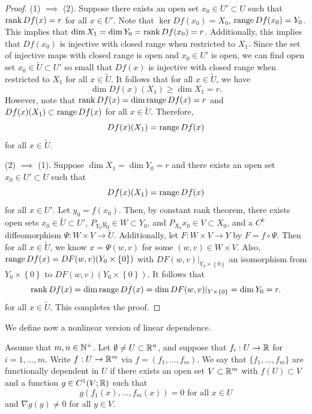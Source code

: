 \documentclass[a4paper]{article}
\begin{document}
\begin{proof}
{
\newcommand{\py}{{P_{Y_0}}}
\newcommand{\pyy}{{P_{Y_1}}}
\newcommand{\px}{{P_{X_0}}}
\newcommand{\pxx}{{P_{X_1}}}
(1) $\implies$ (2). Suppose there exists an open set 
$x_0 \in U' \subset U$ such that $\operatorname{rank} Df(x) = r$
for all $x \in U'$. Note that $\ker Df(x_0) = X_0$, 
$\operatorname{range} Df(x_0) = Y_0$. 
This implies that $\dim X_1 = \dim Y_0 = \operatorname{rank} Df(x_0) = r$.
Additionally, 
this implies that $Df(x_0)$ is injective with closed 
range when restricted to $X_1$. Since the set of 
injective maps with closed range is open and 
$x_0 \in U'$ is open, we can find open set 
$x_0 \in \tilde{U} \subset U'$
so small that $Df(x)$ is injective with closed range 
when restricted to $X_1$ for all $x \in \tilde{U}$. 
It follows that for all $x \in \tilde{U}$, we have 
\[
\dim Df(x) (X_1) \geq \dim X_1 = r.
\]
However, note that 
$\operatorname{rank} Df(x) = \dim \operatorname{range} Df(x) = r$ 
and $Df(x) (X_1) \subset \operatorname{range} Df(x)$ for all $x \in \tilde{U}$.
Therefore,
\[
Df(x) (X_1) = \operatorname{range} Df(x)
\] 
for all $x \in \tilde{U}$.

(2) $\implies$ (1).
Suppose $\dim X_1 = \dim Y_0 = r$ and there exists an open 
set $x_0 \in U' \subset U$ such that 
\[
Df(x)(X_1) = \operatorname{range} Df(x)
\]
for all $x \in U'$.
Let $y_0 = f(x_0)$.
Then, by constant rank theorem, 
there exists open sets 
$x_0 \in \tilde{U} \subset U'$, $\py y_0 \in W \subset Y_0$,
and $\px x_0 \in V \subset X_0$, and a $C^k$ diffeomorphism 
$\Psi: W \times V \to \tilde{U}$. 
Additionally, let $F : W \times V \to Y$ by 
$F = f \circ \Psi$. Then for all $x \in \tilde{U}$,
we know $x = \Psi(w, v)$ for some $(w,v) \in W \times V$.
Also, $\operatorname{range} Df(x) = DF(w, v)(Y_0 \times \left\{ 0 \right\})$
with $DF(w, v) \vert_{Y_0 \times \left\{ 0 \right\}}$ an 
isomorphism from $Y_0 \times \left\{ 0 \right\}$ to 
$DF(w, v) (Y_0 \times \left\{ 0 \right\})$. 
It follows that 
\[
\operatorname{rank} Df(x) = \dim \operatorname{range} Df(x) 
= \dim DF(w, v) \vert_{Y \times \left\{ 0 \right\}}
= \dim Y_0 = r.
\]
for all $x \in \tilde{U}$. This completes the proof.
}

\end{proof}

We define now a nonlinear version of linear dependence.
\begin{defi}
Assume that $m,n \in \mathbb{N}^+$.  Let 
$\emptyset \neq U \subset \mathbb{R}^n$, and suppose that 
$f_i: U \to \mathbb{R}$ for $i=1,\dots,m$.  Write 
$f: U \to \mathbb{R}^m$ via $f = (f_1,\dots,f_m)$.  
We say that $\{f_1,\dots,f_m\}$ are functionally 
dependent in $U$ if there exists an open set 
$V \subset \mathbb{R}^m$ with $f(U) \subset V$ and 
a function $g \in C^1(V;\mathbb{R})$ such that 
\[
 g(f_1(x),\dots,f_m(x)) =0 \text{ for all } x\in U
\]
and $\nabla g(y) \neq 0$ for all $y \in V$.
\end{defi}
\end{document}
